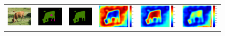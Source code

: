 \documentclass[10pt,twocolumn,letterpaper]{article}
\begin{document}

\begin{figure}
  \centering
  \begin{tabular}{c c c c c c}
   \includegraphics[height=0.09\linewidth]{fig/voc12/img/2010_004789.jpg} &
   \includegraphics[height=0.09\linewidth]{fig/voc12/res_baseline/2010_004789.png} &
   \includegraphics[height=0.09\linewidth]{fig/voc12/res_sharenet/2010_004789.png} &
   \includegraphics[height=0.09\linewidth]{fig/voc12/att1/2010_004789.pdf} &
   \includegraphics[height=0.09\linewidth]{fig/voc12/att2/2010_004789.pdf} &
   \includegraphics[height=0.09\linewidth]{fig/voc12/att3/2010_004789.pdf} \\

\end{tabular}
\end{figure}
\end{document}
